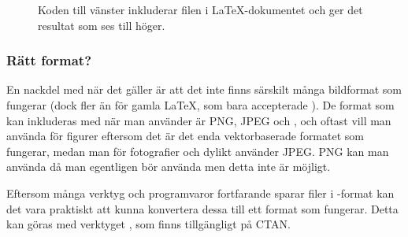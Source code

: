 \documentclass[../../a4.tex]{subfiles}
\begin{document}
\begin{figure}[tbp]
	\centering
	\hspace{-0.025\textwidth}
	\begin{minipage}{0.475\textwidth} %
	\end{minipage}
	\hfil
	\begin{minipage}{0.475\textwidth} %
	\end{minipage}
	\caption{Koden till vänster inkluderar filen  i
	\LaTeX-dokumentet och ger det resultat som ses till höger.}
	\label{fig:graphicx}
\end{figure}

\subsubsection{Rätt format?}
En nackdel med \pdfLaTeX{} när det gäller  är att det inte
finns särskilt många bildformat som fungerar (dock fler än för gamla
\LaTeX{}, som bara accepterade \EPS). De format som kan inkluderas
med  när man använder \pdfLaTeX{} är \textsc{PNG},
\textsc{JPEG} och \PDF, och oftast vill man använda \PDF{} för figurer
eftersom
det är det enda vektorbaserade formatet som fungerar, medan man för
fotografier och dylikt använder \textsc{JPEG}. \textsc{PNG} kan man
använda då man egentligen bör använda \PDF{} men detta inte är möjligt.

Eftersom många verktyg och programvaror fortfarande sparar filer i
\EPS-format kan det vara praktiskt att kunna konvertera dessa till ett
format som fungerar. Detta kan göras med verktyget , som
finns tillgängligt på CTAN.
\end{document}

